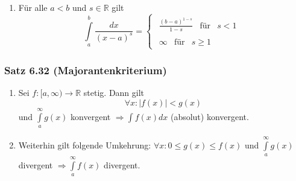 \begin{enumerate}
\begin{enumerate}
\item Für alle $a<b$ und $s\in\mathbb{R}$ gilt \[\int\limits_a^b {\frac{{dx}}{{{{(x - a)}^s}}}}  = \left\{ {\begin{array}{*{20}{c}}
{\begin{array}{*{20}{c}}
{\frac{{{{(b - a)}^{1 - s}}}}{{1 - s}}}&\text{für}&{s < 1}
\end{array}}\\
{\begin{array}{*{20}{c}}
\infty &{{\text{für}}}&{s \ge 1}
\end{array}}
\end{array}} \right.\]
\end{enumerate}
\end{enumerate}
\subsubsection*{Satz 6.32 (Majorantenkriterium)}
\begin{enumerate}[\indent a)]
\item Sei $f:\lbrack a,\infty )\rightarrow\mathbb{R}$ stetig. Dann gilt $$\forall x:\left| f(x)\right| <g(x)$$ und $\int\limits_a^\infty  {g(x)}$ konvergent $\Rightarrow \int {f(x)dx} $ (absolut) konvergent.
\item Weiterhin gilt folgende Umkehrung: $\forall x:0\leq g(x)\leq f(x)$ und $\int\limits_a^\infty  {g(x)}$ divergent $\Rightarrow \int\limits_a^\infty  {f(x)}$ divergent.
\end{enumerate}


